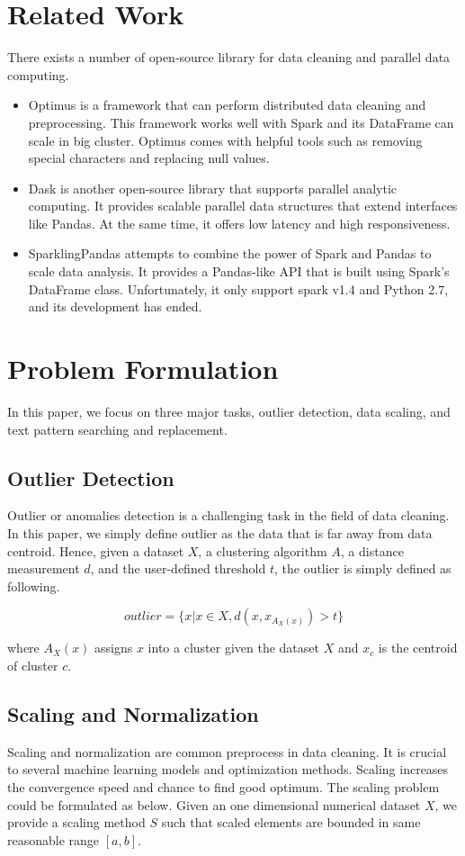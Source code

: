 \documentclass[sigconf]{acmart}
\begin{document}
\section{Related Work}
There exists a number of open-source library for data cleaning and parallel data computing. 
\begin{itemize}
	\item{Optimus}\cite{optimus} is a framework that can perform distributed data cleaning and preprocessing. This framework works well with Spark and its DataFrame can scale in big cluster. Optimus comes with helpful tools such as removing special characters and replacing null values.
	\item{Dask}\cite{dask} is another open-source library that supports parallel analytic computing. It provides scalable parallel data structures that extend interfaces like Pandas. At the same time, it offers low latency and high responsiveness.
	\item{SparklingPandas}\cite{sparklingpandas} attempts to combine the power of Spark and Pandas to scale data analysis. It provides a Pandas-like API that is built using Spark's DataFrame class. Unfortunately, it only support spark v1.4 and Python 2.7, and its development has ended.
\end{itemize}

\section{Problem Formulation}
In this paper, we focus on three major tasks, outlier detection, data scaling, and text pattern searching and replacement.
\subsection{Outlier Detection}
Outlier or anomalies detection is a challenging task in the field of data cleaning\cite{anomal}. In this paper, we simply define outlier as the data that is far away from data centroid. Hence, given a dataset $X$, a clustering algorithm $A$\cite{MMD}, a distance measurement $d$, and the user-defined threshold $t$, the outlier is simply defined as following.

\[ outlier = \{x | x \in X, d( x, x_{A_X(x)} ) > t \}  \]

where $A_X(x)$ assigns $x$ into a cluster given the dataset $X$ and $x_c$  is the centroid of cluster $c$.

\subsection{Scaling and Normalization}
Scaling and normalization are common preprocess in data cleaning. It is crucial to several machine learning models and optimization methods. Scaling increases the convergence speed and chance to find good optimum\cite{convex}. The scaling problem could be formulated as below.
Given an one dimensional numerical dataset $X$, we provide a scaling method $S$ such that scaled elements are bounded in same reasonable range $[a, b]$.
\end{document}
